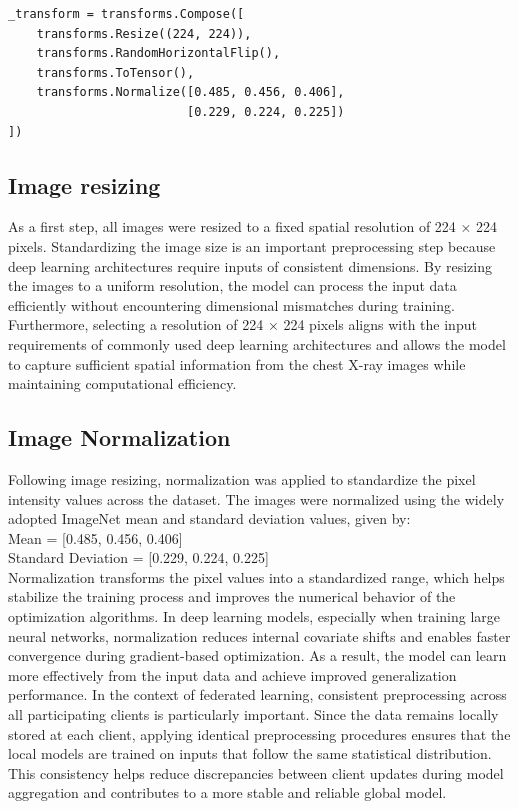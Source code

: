 \documentclass[12pt]{book}
\begin{document}
\begin{verbatim}
_transform = transforms.Compose([
    transforms.Resize((224, 224)),
    transforms.RandomHorizontalFlip(),
    transforms.ToTensor(),
    transforms.Normalize([0.485, 0.456, 0.406],
                         [0.229, 0.224, 0.225])
])
\end{verbatim}


\subsection{Image resizing}
As a first step, all images were resized to a fixed spatial resolution of 224 × 224 pixels. Standardizing the image size is an important preprocessing step because deep learning architectures require inputs of consistent dimensions. By resizing the images to a uniform resolution, the model can process the input data efficiently without encountering dimensional mismatches during training. Furthermore, selecting a resolution of 224 × 224 pixels aligns with the input requirements of commonly used deep learning architectures and allows the model to capture sufficient spatial information from the chest X-ray images while maintaining computational efficiency.

\subsection{Image Normalization}

Following image resizing, normalization was applied to standardize the pixel intensity values across the dataset. The images were normalized using the widely adopted ImageNet mean and standard deviation values, given by:\\
Mean = [0.485, 0.456, 0.406]\\
Standard Deviation = [0.229, 0.224, 0.225]\\
Normalization transforms the pixel values into a standardized range, which helps stabilize the training process and improves the numerical behavior of the optimization algorithms. In deep learning models, especially when training large neural networks, normalization reduces internal covariate shifts and enables faster convergence during gradient-based optimization. As a result, the model can learn more effectively from the input data and achieve improved generalization performance.
In the context of federated learning, consistent preprocessing across all participating clients is particularly important. Since the data remains locally stored at each client, applying identical preprocessing procedures ensures that the local models are trained on inputs that follow the same statistical distribution. This consistency helps reduce discrepancies between client updates during model aggregation and contributes to a more stable and reliable global model.
\end{document}
